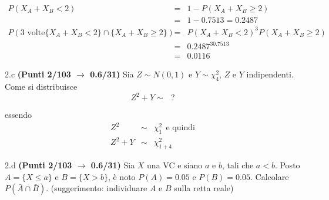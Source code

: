 \documentclass[
  11pt,
]{book}
\theoremstyle{mytheoremstyle}
\theoremstyle{mydefstyle}
\newenvironment{sol}
  {
  \begin{tcolorbox}[enhanced,breakable,arc=0.1mm,boxrule=1pt,colback=white,colframe=iblue,
  title=\bf \fontfamily{lmss}\selectfont \hspace{.5 cm} Soluzione,drop fuzzy shadow]

}{
\end{tcolorbox}
  }
\begin{document}
\begin{sol}
\begin{eqnarray*}
P(X_A + X_B < 2) &=& 1 - P(X_A + X_B \ge 2) \\
                 &=& 1 - 0.7513=0.2487\\
P(\text{3 volte}\{X_A + X_B < 2\}\cap\{X_A + X_B \ge 2\} ) &=& P(X_A + X_B < 2)^3P(X_A + X_B \ge 2)\\
 &=& 0.2487^30.7513\\
 &=& 0.0116
\end{eqnarray*}

\end{sol}

2.c \textbf{(Punti 2/103 \(\rightarrow\) 0.6/31)} Sia \(Z\sim N(0,1)\) e \(Y\sim \chi^2_4\), \(Z\) e \(Y\) indipendenti.
Come si distribuisce
\[
Z^2+Y\sim ~~~?
\]

\begin{sol}
essendo
\begin{eqnarray*}
Z^2 &\sim& \chi_1^2~~\text{e quindi} \\
Z^2+Y &\sim& \chi^2_{1+4}
\end{eqnarray*}

\end{sol}

2.d \textbf{(Punti 2/103 \(\rightarrow\) 0.6/31)} Sia \(X\) una VC e siano \(a\) e \(b\), tali che \(a<b\). Posto \(A=\{X\le a\}\) e \(B=\{X > b\}\), è noto \(P(A)=0.05\) e \(P(B)=0.05\). Calcolare \(P(\bar A\cap \bar B)\). (suggerimento: individuare \(A\) e \(B\) sulla retta reale)
\end{document}
